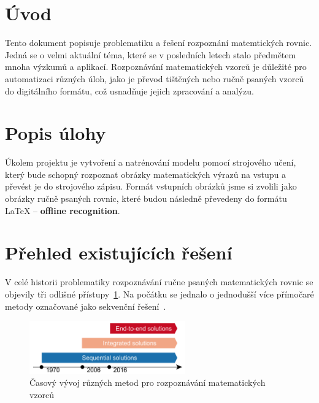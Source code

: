 \section{Úvod}
Tento dokument popisuje problematiku a řešení rozpoznání matemtických rovnic. Jedná se o velmi aktuální téma, které se v posledních letech stalo předmětem mnoha výzkumů a aplikací. Rozpoznávání matematických vzorců je důležité pro automatizaci různých úloh, jako je převod tištěných nebo ručně psaných vzorců do digitálního formátu, což usnadňuje jejich zpracování a analýzu.


\section{Popis úlohy}
Úkolem projektu je vytvoření a natrénování modelu pomocí strojového učení, který bude schopný rozpoznat obrázky matematických výrazů na vstupu a převést je do strojového zápisu. Formát vstupních obrázků jsme si zvolili jako obrázky ručně psaných rovnic, které budou následně převedeny do formátu LaTeX -- \textbf{offline recognition}.


\section{Přehled existujících řešení}
V celé historii problematiky rozpoznávání ručne psaných matematických rovnic se objevily tři odlišné přístupy~\ref{img:method_history}. Na počátku se jednalo o jednodušší více přímočaré metody označované jako sekvenční řešení~\cite{ukr_survey}.

\begin{figure}[H]
    \centering
    \includegraphics[width=0.6\textwidth]{img/method_history.png}
    \caption{Časový vývoj různých metod pro rozpoznávání matematických vzorců}
    \label{img:method_history}
\end{figure}

